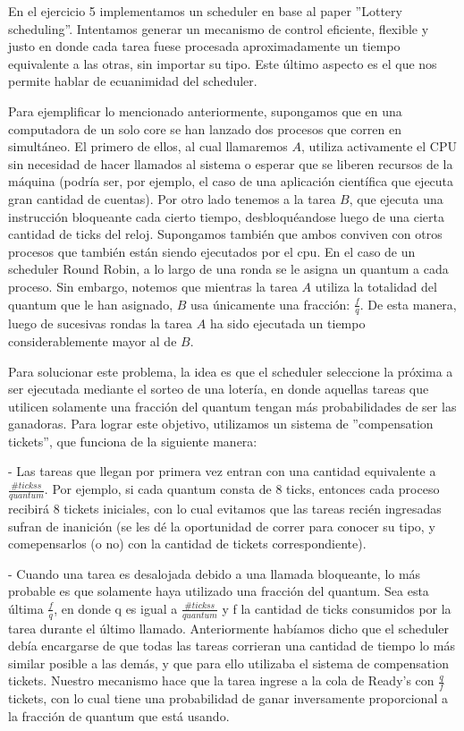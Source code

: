 
En el ejercicio 5 implementamos un scheduler en base al paper ''Lottery scheduling''. Intentamos generar un mecanismo de control eficiente, flexible y justo en donde cada tarea fuese procesada
aproximadamente un tiempo equivalente a las otras, sin importar su tipo. Este último aspecto es el que nos permite hablar de ecuanimidad del scheduler.

Para ejemplificar lo mencionado anteriormente, supongamos que en una computadora de un solo core se han lanzado dos procesos que corren en simultáneo. El primero de ellos, al cual llamaremos $A$, utiliza
activamente el CPU sin necesidad de hacer llamados al sistema o esperar que se liberen recursos de la máquina (podría ser, por ejemplo, el caso de una aplicación científica que ejecuta gran cantidad de 
cuentas). Por otro lado tenemos a la tarea $B$, que ejecuta una instrucción bloqueante cada cierto tiempo, desbloquéandose luego de una cierta cantidad de ticks del reloj. Supongamos también que ambos conviven
con otros procesos que también están siendo ejecutados por el cpu. En el caso de un scheduler Round Robin, a lo largo de una ronda se le asigna un quantum a cada proceso. Sin embargo, notemos que mientras
la tarea $A$ utiliza la totalidad del quantum que le han asignado, $B$ usa únicamente una fracción: $\frac{f}{q}$. De esta manera, luego de sucesivas rondas la tarea $A$ ha sido ejecutada un tiempo
considerablemente mayor al de $B$.

Para solucionar este problema, la idea es que el scheduler seleccione la próxima a ser ejecutada mediante el sorteo de una lotería, en donde aquellas tareas que utilicen solamente una fracción del quantum
tengan más probabilidades de ser las ganadoras. Para lograr este objetivo, utilizamos un sistema de ''compensation tickets'', que funciona de la siguiente manera:

- Las tareas que llegan por primera vez entran con una cantidad equivalente a $\frac{\#tickss}{quantum}$. Por ejemplo, si cada quantum consta de 8 ticks, entonces cada
proceso recibirá 8 tickets iniciales, con lo cual evitamos que las tareas recién ingresadas sufran de inanición (se les dé la oportunidad de correr para conocer su tipo, 
y comepensarlos (o no) con la cantidad de tickets correspondiente).

- Cuando una tarea es desalojada debido a una llamada bloqueante, lo más probable es que solamente haya utilizado una fracción del quantum. Sea esta última $\frac{f}{q}$,
en donde q es igual a $\frac{\#tickss}{quantum}$ y f la cantidad de ticks consumidos por la tarea durante el último llamado.
Anteriormente habíamos dicho que el scheduler debía encargarse de que todas las tareas corrieran una cantidad de tiempo lo más similar posible a las demás, y que para ello utilizaba
el sistema de compensation tickets. Nuestro mecanismo hace que la tarea ingrese a la cola de Ready's con $\frac{q}{f}$ tickets, con lo cual tiene una probabilidad de ganar
inversamente proporcional a la fracción de quantum que está usando.

